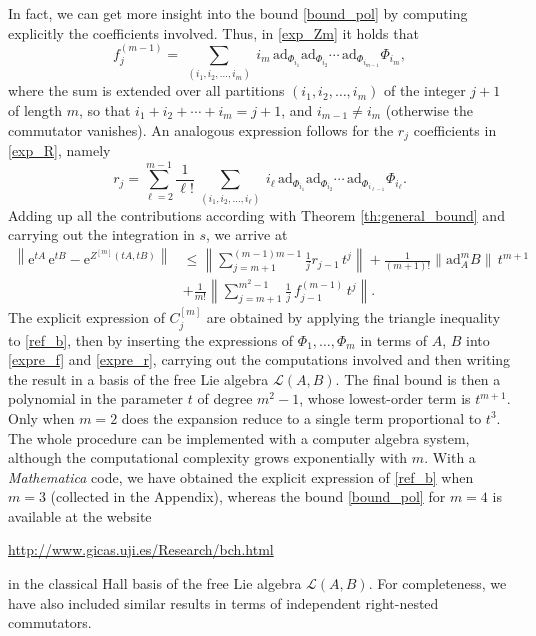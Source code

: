 \documentclass[11pt]{article}
\newcommand{\e}{\ensuremath{\mathrm{e}}}
\newcommand{\ad}{\ensuremath{\mathrm{ad}}}
\begin{document}
In fact, we can get more insight into the bound \eqref{bound_pol} by computing explicitly the coefficients involved. Thus, in \eqref{exp_Zm}
it holds that 
\begin{equation} \label{expre_f}
  f_j^{(m-1)} = \ \sum_{(i_1,i_2,\ldots,i_m)} \  i_m \, \ad_{\Phi_{i_1}}  \ad_{\Phi_{i_2}}  \cdots  \, \ad_{\Phi_{i_{m-1}}}  \Phi_{i_m},
\end{equation}
where the sum is extended over all partitions $(i_1,i_2,\ldots,i_m)$ of the integer $j+1$ of length $m$, 
so that $i_1 + i_2 + \cdots +i_m = j+1$, and $i_{m-1} \ne i_m$ (otherwise the commutator vanishes). 
An analogous expression follows
for the $r_j$ coefficients in \eqref{exp_R}, namely
\begin{equation} \label{expre_r}
  r_j = \sum_{\ell = 2}^{m-1} \frac{1}{\ell!} \ \sum_{(i_1,i_2,\ldots,i_{\ell})} \  i_{\ell} \, 
  \ad_{\Phi_{i_1}}  \ad_{\Phi_{i_2}}  \cdots  \, \ad_{\Phi_{i_{\ell-1}}}  \Phi_{i_{\ell}}.
\end{equation}
Adding up all the contributions according with Theorem \ref{th:general_bound} and carrying out the integration in $s$, we arrive at
\begin{equation} \label{ref_b}
\begin{aligned}
    \left\| \e^{t A} \, \e^{t B} - \e^{Z^{[m]}(tA, tB) } \right\| & \le \left\| \sum_{j = m+1}^{(m-1)m-1} \frac{1}{j}  r_{j-1} \, t^j \right\| + 
    \frac{1}{(m+1)!} \| \ad_A^m B\| \, t^{m+1} \\
    & +  \frac{1}{m!} \left\| \sum_{j = m+1}^{m^2-1} \frac{1}{j}  \, f_{j-1}^{(m-1)} \, t^j \right\|.
\end{aligned}    
\end{equation}    
The explicit expression of $C_j^{[m]}$ are obtained by applying the triangle inequality to \eqref{ref_b}, then by inserting
 the expressions of $\Phi_1, \ldots, \Phi_m$ in terms of $A$, $B$ 
into \eqref{expre_f} and \eqref{expre_r}, carrying out the computations involved and then writing the result
 in a basis of the free Lie algebra $\mathcal{L}(A,B)$. The final bound is then
a polynomial in the parameter \(t\) of degree \(m^2 - 1\), whose lowest-order term is \(t^{m+1}\). Only when $m=2$ does the expansion reduce 
 to a single term proportional to \(t^3\). The whole procedure can be  implemented with a
computer algebra system, although the computational complexity grows exponentially with $m$. With a \emph{Mathematica} code, we have obtained
the explicit expression of \eqref{ref_b} when $m=3$ (collected in the Appendix), whereas the bound \eqref{bound_pol} for $m=4$ is available at the website 
\begin{center}
  \url{http://www.gicas.uji.es/Research/bch.html}
\end{center}  
in the classical Hall
basis of the free Lie algebra $\mathcal{L}(A,B)$. For completeness, we have also included similar results in terms of independent right-nested commutators.
\end{document}
